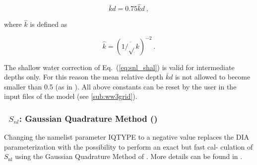 
\begin{equation}
\bar{k} d = 0.75 \hat{k} d \: , \label{eq:kd_num}
\end{equation}

\noindent
where $\hat{k}$ is defined as

\begin{equation}
\hat{k} = \left ( \overline{1/\sqrt{}k} \right )^{-2} \: .
\label{eq:k_hat}
\end{equation}

\noindent
The shallow water correction of Eq.~(\ref{eq:snl_shal}) is valid for
intermediate depths only. For this reason the mean relative depth
$\bar{k}d$ is not allowed to become smaller than 0.5 (as in \wam). All
above constants can be reset by the user in the input files of the
model (see \para\ref{sub:ww3grid}).

\vsssub
\subsubsection{~$S_{nl}$: Gaussian Quadrature Method  (\dia)} \label{sec:GQM}
\vsssub


\noindent
Changing the namelist parameter IQTYPE to a negative value replaces the
DIA parameterization with the possibility to perform an exact but fast cal-
culation of $S_{\mathrm{nl}}$ using the Gaussian Quadrature Method of \cite{Lavrenov2001}.
More details can be found in \cite{Gagnaire-Renou2009}.

